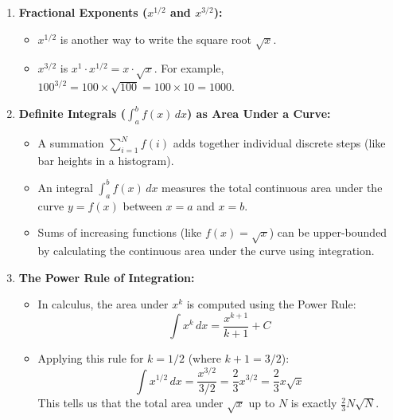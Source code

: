 \documentclass[10pt,journal,compsoc,onecolumn]{IEEEtran}
\begin{document}
\begin{enumerate}
    \item \textbf{Fractional Exponents ($x^{1/2}$ and $x^{3/2}$):}
    \begin{itemize}
        \item $x^{1/2}$ is another way to write the square root $\sqrt{x}$.
        \item $x^{3/2}$ is $x^1 \cdot x^{1/2} = x \cdot \sqrt{x}$. For example, $100^{3/2} = 100 \times \sqrt{100} = 100 \times 10 = 1000$.
    \end{itemize}

    \item \textbf{Definite Integrals ($\int_{a}^{b} f(x) \, dx$) as Area Under a Curve:}
    \begin{itemize}
        \item A summation $\sum_{i=1}^N f(i)$ adds together individual discrete steps (like bar heights in a histogram).
        \item An integral $\int_{a}^{b} f(x) \, dx$ measures the total continuous area under the curve $y = f(x)$ between $x=a$ and $x=b$.
        \item Sums of increasing functions (like $f(x) = \sqrt{x}$) can be upper-bounded by calculating the continuous area under the curve using integration.
    \end{itemize}

    \item \textbf{The Power Rule of Integration:}
    \begin{itemize}
        \item In calculus, the area under $x^k$ is computed using the Power Rule:
        \[
        \int x^k \, dx = \frac{x^{k+1}}{k+1} + C
        \]
        \item Applying this rule for $k = 1/2$ (where $k+1 = 3/2$):
        \[
        \int x^{1/2} \, dx = \frac{x^{3/2}}{3/2} = \frac{2}{3} x^{3/2} = \frac{2}{3} x \sqrt{x}
        \]
        This tells us that the total area under $\sqrt{x}$ up to $N$ is exactly $\frac{2}{3} N \sqrt{N}$.
    \end{itemize}
\end{enumerate}
\end{document}
